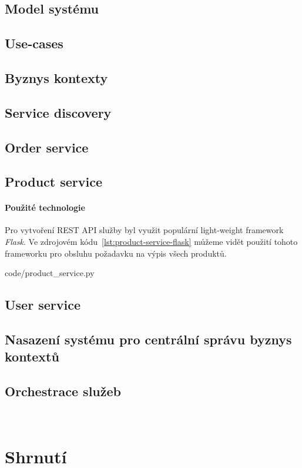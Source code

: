 \subsection{Model systému}

\subsection{Use-cases}

\subsection{Byznys kontexty}

\subsection{Service discovery}

\subsection{Order service}

\subsection{Product service}

\paragraph{Použité technologie} Pro vytvoření REST API služby
byl využit populární light-weight framework \textit{Flask}.
Ve zdrojovém kódu~\ref{lst:product-service-flask} můžeme
vidět použití tohoto frameworku pro obsluhu požadavku na
výpis všech produktů.


{code/product_service.py}

\subsection{User service}

\subsection{Nasazení systému pro centrální správu byznys kontextů}

\subsection{Orchestrace služeb}

~\cite{merkel2014docker}

\section{Shrnutí}
